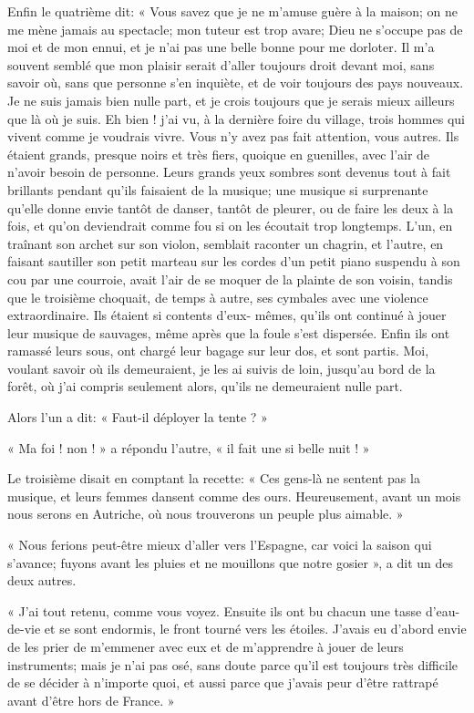 Enfin le quatrième dit: « Vous savez que je ne m’amuse
guère à la maison; on ne me mène jamais au spectacle; mon tuteur est
trop avare; Dieu ne s’occupe pas de moi et de mon
ennui, et je n’ai pas une belle bonne pour me
dorloter. Il m’a souvent semblé que mon plaisir serait
d’aller toujours droit devant moi, sans savoir où,
sans que personne s’en inquiète, et de voir toujours
des pays nouveaux. Je ne suis jamais bien nulle part, et je crois
toujours que je serais mieux ailleurs que là où je suis. Eh bien !
j’ai vu, à la dernière foire du village, trois hommes
qui vivent comme je voudrais vivre. Vous n’y avez pas
fait attention, vous autres. Ils étaient grands, presque noirs et
très fiers, quoique en guenilles, avec l’air de
n’avoir besoin de personne. Leurs grands yeux sombres
sont devenus tout à fait brillants pendant qu’ils
faisaient de la musique; une musique si surprenante
qu’elle donne envie tantôt de danser, tantôt de
pleurer, ou de faire les deux à la fois, et qu’on
deviendrait comme fou si on les écoutait trop longtemps.
L’un, en traînant son archet sur son violon, semblait
raconter un chagrin, et l’autre, en faisant sautiller
son petit marteau sur les cordes d’un petit piano
suspendu à son cou par une courroie, avait l’air de se
moquer de la plainte de son voisin, tandis que le troisième choquait,
de temps à autre, ses cymbales avec une violence extraordinaire. Ils
étaient si contents d’eux{}- mêmes,
qu’ils ont continué à jouer leur musique de sauvages,
même après que la foule s’est dispersée. Enfin ils ont
ramassé leurs sous, ont chargé leur bagage sur leur dos, et sont
partis. Moi, voulant savoir où ils demeuraient, je les ai suivis de
loin, jusqu’au bord de la forêt, où
j’ai compris seulement alors, qu’ils
ne demeuraient nulle part.

Alors l’un a dit: « Faut{}-il déployer la tente ? »

« Ma foi ! non ! » a répondu l’autre, « il fait une si
belle nuit ! »

Le troisième disait en comptant la recette: « Ces gens{}-là ne sentent
pas la musique, et leurs femmes dansent comme des ours. Heureusement,
avant un mois nous serons en Autriche, où nous trouverons un peuple
plus aimable. »

« Nous ferions peut{}-être mieux d’aller vers
l’Espagne, car voici la saison qui
s’avance; fuyons avant les pluies et ne mouillons que
notre gosier », a dit un des deux autres.

« J’ai tout retenu, comme vous voyez. Ensuite ils ont
bu chacun une tasse d’eau{}-de{}-vie et se sont
endormis, le front tourné vers les étoiles. J’avais eu
d’abord envie de les prier de
m’emmener avec eux et de m’apprendre
à jouer de leurs instruments; mais je n’ai pas osé,
sans doute parce qu’il est toujours très difficile
de se décider à n’importe quoi, et aussi parce que
j’avais peur d’être rattrapé avant
d’être hors de France. »

